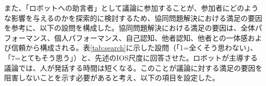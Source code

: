\documentclass[11pt, a4paper]{jreport} %
\begin{document}

また、「ロボットへの助言者」として議論に参加することが、参加者にどのような影響を与えるのかを探索的に検討するため、協同問題解決における満足の要因\cite{2009}を参考に、以下の設問を構成した。協同問題解決における満足の要因は、全体パフォーマンス、個人パフォーマンス、自己認知、他者認知、他者との一体感および信頼から構成される。表\ref{tab:search}に示した設問（「1=全くそう思わない」、「7=とてもそう思う」）と、先述のIOS尺度に回答させた。ロボットが主導する議論では、人が発話する時間は短くなる。このことが議論に対する満足の要因を阻害しないことを示す必要があると考え、以下の項目を設定した。
\end{document}
